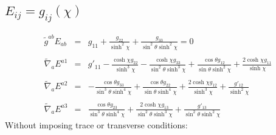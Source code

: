 \documentclass[10pt,letterpaper]{article}
\numberwithin{equation}{section}
\begin{document}
\subsection{$E_{ij} = g_{ij}(\chi)$}
\begin{eqnarray}
\tilde g^{ab}E_{ab}&=& g_{11} + \frac{g_{22}}{\sinh^2\chi} + \frac{g_{33}}{\sin^2\theta \sinh^2\chi} =0
\\ \nonumber\\
\tilde\nabla_a E^{a 1}&=& g'_{11} -  \frac{\cosh\chi g_{22}}{\sinh^3\chi} -  \frac{\cosh\chi g_{33}}{\sin^2\theta \sinh^3\chi} + \frac{\cos\theta g_{12}}{\sin\theta \sinh^2\chi} + \frac{2 \cosh\chi g_{11}}{\sinh\chi}
\\  \nonumber\\ 
\tilde\nabla_a E^{a 2}&=& - \frac{\cos\theta g_{33}}{\sin^3\theta \sinh^4\chi} + \frac{\cos\theta g_{22}}{\sin\theta \sinh^4\chi} + \frac{2 \cosh\chi g_{12}}{\sinh^3\chi} + \frac{g'_{12}}{\sinh^2\chi}
\\  \nonumber\\ 
\tilde\nabla_a E^{a 3}&=& \frac{\cos\theta g_{23}}{\sin^3\theta \sinh^4\chi} + \frac{2 \cosh\chi g_{13}}{\sin^2\theta \sinh^3\chi} + \frac{g'_{13}}{\sin^2\theta \sinh^2\chi}
\end{eqnarray}
Without imposing trace or transverse conditions:
\end{document}
